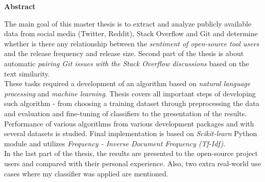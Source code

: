 \begin{center}
\textbf{Abstract}
\end{center}

The main goal of this master thesis is to extract and analyze publicly available data from social media (Twitter, Reddit), Stack Overflow and Git and determine whether is there any relationship between the \textit{sentiment of open-source tool users} and the release frequency and release size. Second part of the thesis is about automatic \textit{pairing Git issues with the Stack Overflow discussions} based on the text similarity.\\
These tasks required a development of an algorithm based on \textit{natural language processing} and \textit{machine learning}. Thesis covers all important steps of developing such algorithm - from choosing a training dataset through preprocessing the data and evaluation and fine-tuning of classifiers to the presentation of the results. Performance of various algorithms from various development packages and with several datasets is studied. Final implementation is based on \textit{Scikit-learn} Python module and utilizes \textit{Frequency - Inverse Document Frequency (Tf-Idf)}.\\
In the last part of the thesis, the results are presented to the open-source project users and compared with their personal experience. Also, two extra real-world use cases where my classifier was applied are mentioned.